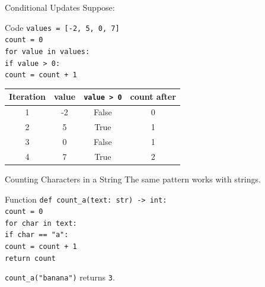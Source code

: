 \documentclass[aspectratio=169,10pt]{beamer}
\begin{document}
\begin{frame}{Conditional Updates}
  Suppose:

  \begin{block}{Code}
    \texttt{values = [-2, 5, 0, 7]}\\
    \texttt{count = 0}\\
    \texttt{for value in values:}\\
    \hspace{0.20in}\texttt{if value > 0:}\\
    \hspace{0.40in}\texttt{count = count + 1}
  \end{block}

  \begin{center}
    \renewcommand{\arraystretch}{1.25}
    \begin{tabular}{c|c|c|c}
      \textbf{Iteration} & \textbf{value} & \textbf{\texttt{value > 0}} & \textbf{count after} \\\hline
      1 & -2 & False & 0 \\
      2 & 5 & True & 1 \\
      3 & 0 & False & 1 \\
      4 & 7 & True & 2
    \end{tabular}
  \end{center}
\end{frame}



\begin{frame}{Counting Characters in a String}
  The same pattern works with strings.

  \begin{block}{Function}
    \texttt{def count\_a(text: str) -> int:}\\
    \hspace{0.20in}\texttt{count = 0}\\
    \hspace{0.20in}\texttt{for char in text:}\\
    \hspace{0.40in}\texttt{if char == "a":}\\
    \hspace{0.60in}\texttt{count = count + 1}\\
    \hspace{0.20in}\texttt{return count}
  \end{block}

  \texttt{count\_a("banana")} returns \texttt{3}.
\end{frame}
\end{document}
